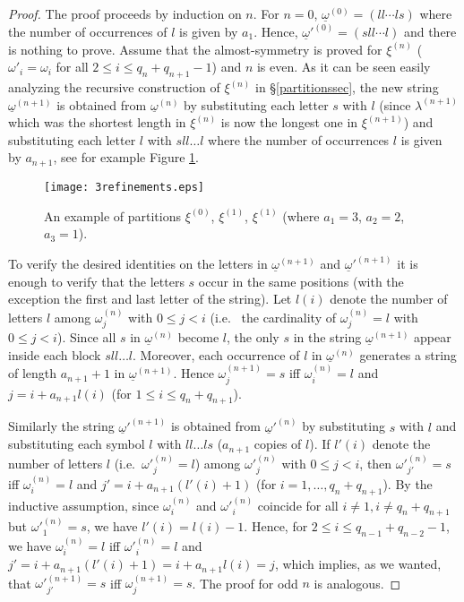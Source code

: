 \documentclass{conm-p-l}
\numberwithin{equation}{section}
\begin{document}
\begin{proof}

The proof proceeds by induction on $n$. For $n=0$, $\underline{\omega}^{(0)}=
(ll\cdots ls)$ where the number of occurrences of $l$ is given by $a_1$. Hence,
$\underline{\omega}'^{(0)}= (sll\cdots l)$ and there is nothing to prove. Assume
that the almost-symmetry is proved for $\xi^{(n)}$ ($\omega'_{i} = \omega_{i}$ for
all $2\leq i \leq q_n+q_{n+1}-1$) and $n$ is even. As it can be seen easily analyzing the recursive
construction of $\xi^{(n)}$ in \S\ref{partitionssec}, the new string
$\underline{\omega}^{(n+1)}$ is obtained from   $\underline{\omega}^{(n)}$ by
substituting  each letter $s$ with $l$ (since $\lambda^{(n+1)}$ which was the
shortest length in $\xi^{(n)}$ is now the longest one in $\xi^{(n+1)}$) and
substituting each letter $l$ with $sll\dots l$ where the number of occurrences
$l$ is given by $a_{n+1}$, see for example Figure \ref{3refinements}.
 \begin{figure}
\centering
\texttt{[image: 3refinements.eps]}
\caption{An example of partitions $\xi^{(0)}$,  $\xi^{(1)}$,  $\xi^{(1)}$ (where $a_1=3$, $a_2=2$, $a_3=1$).\label{3refinements}}
\end{figure}

To verify the desired identities on the letters in $\underline{\omega}^{(n+1)}$ and
$\underline{\omega}'^{(n+1)}$ it is enough to verify that the letters $s$ occur
in the same positions (with the exception the first and last letter of the string). Let
$l(i)$ denote the number of letters $l$ among $\omega^{(n)}_j$ with $0\leq j <
i$ (i.e.~ the cardinality of $\omega^{(n)}_j=l$ with  $0\leq j < i$). Since all
$s$ in  $\underline{\omega}^{(n)}$ become $l$, the only $s$ in the string
$\underline{\omega}^{(n+1)}$ appear inside each block $sll\dots l$. Moreover,
each occurrence of $l$ in $\underline{\omega}^{(n)}$ generates a string of
length $a_{n+1}+1$ in $\underline{\omega}^{(n+1)}$. Hence ${\omega}_j^{(n+1)}= s$
iff ${\omega}_i^{(n)}= l$ and $j= i+  a_{n+1}l(i)$ (for $1\leq i \leq q_{n}+q_{n+1}$).

Similarly the string $\underline{\omega}'^{(n+1)}$ is obtained from
$\underline{\omega}'^{(n)}$ by substituting $s$ with $l$ and substituting each
symbol $l$ with $ll\dots ls$ ($a_{n+1}$ copies of $l$). If $l'(i)$ denote the
number of letters $l$ (i.e.~$\omega'^{(n)}_j=l$) among $\omega'^{(n)}_j$ with
$0\leq j < i$, then ${\omega'}_{j'}^{(n)}=s $ iff ${\omega}_i^{(n)}= l$ and 
$j'= i+ a_{n+1}(l'(i)+1)$ (for $i=1,\dots, q_{n}+q_{n+1}$). By the inductive
assumption, since $\omega^{(n)}_i$ and $\omega'^{(n)}_i$  coincide for all
$i\neq 1, i\neq q_{n}+q_{n+1}$ but $\omega'^{(n)}_1=s$, we have $l'(i) = l(i)-1$.
Hence, for $2\leq i \leq q_{n-1}+q_{n-2}-1$, we have ${\omega}_i^{(n)}= l$ iff
${\omega'}_i^{(n)}= l$ and
 $j'= i+ a_{n+1}(l'(i)+1) = i+ a_{n+1}l(i) = j $, which implies, as we wanted,
that ${\omega'}_{j'}^{(n+1)}=s $ iff   ${\omega}_j^{(n+1)}= s$. The proof for
 odd $n$ is analogous.


\end{proof}
\end{document}
